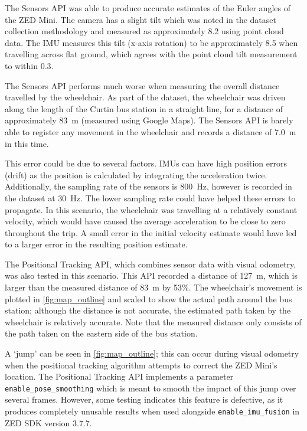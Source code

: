 The Sensors API was able to produce accurate estimates
of the Euler angles of the ZED Mini. The camera has
a slight tilt which was noted in the dataset collection methodology
and measured as approximately 8.2\degree{} using point cloud data.
The IMU measures this tilt (x-axis rotation) to be approximately 8.5\degree{}
when travelling across flat ground, which agrees with the
point cloud tilt measurement to within 0.3\degree{}.

The Sensors API performs much worse when measuring the overall distance
travelled by the wheelchair. As part of the dataset, the wheelchair was
driven along the length of the Curtin bus station in a straight line,
for a distance of approximately \SI{83}{\metre} (measured using Google Maps).
The Sensors API is barely able to register any movement in the
wheelchair and records a distance of \SI{7.0}{\metre} in this time.

This error could be due to several factors. IMUs can have
high position errors (drift) as the position is calculated
by integrating the acceleration twice.
Additionally, the sampling rate of the sensors is \SI{800}{\hertz},
however is recorded in the dataset at \SI{30}{\hertz}. The lower
sampling rate could have helped these errors to propagate.
In this scenario, the wheelchair was travelling at a relatively constant
velocity, which would have caused the average acceleration to be close to zero throughout
the trip. A small error in the initial velocity estimate would have led to a larger
error in the resulting position estimate.

The Positional Tracking API, which combines sensor data with visual odometry,
was also tested in this scenario. This API recorded
a distance of \SI{127}{\metre}, which is larger
than the measured distance of \SI{83}{\metre} by 53\%.
The wheelchair's movement is plotted in \cref{fig:map_outline} and scaled to
show the actual path around the bus station; although the distance is not accurate,
the estimated path taken by the wheelchair is relatively accurate. Note that the measured distance only
consists of the path taken on the eastern side of the bus station.

A `jump' can be seen in \cref{fig:map_outline}; this can occur during visual odometry when
the positional tracking algorithm attempts to correct the ZED Mini's location. The Positional
Tracking API implements a parameter \texttt{enable\_pose\_smoothing} which is meant
to smooth the impact of this jump over several frames. However, some testing
indicates this feature is defective, as it produces completely unusable results
when used alongside \texttt{enable\_imu\_fusion} in ZED SDK version 3.7.7.

